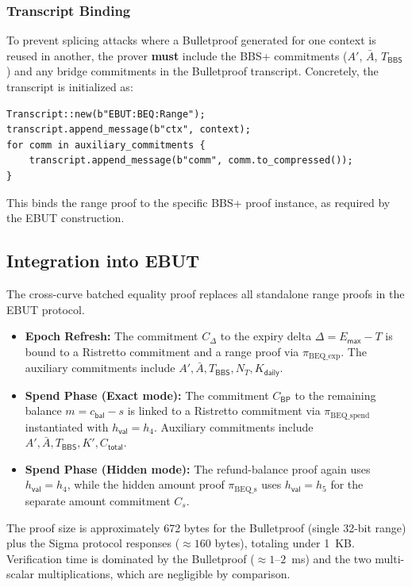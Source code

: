 \documentclass[11pt]{article}
\theoremstyle{definitionstyle}
\theoremstyle{plain}
\begin{document}
\subsubsection{Transcript Binding}
To prevent splicing attacks where a Bulletproof generated for one context is reused in another, the prover \textbf{must} include the BBS+ commitments ($A'$, $\bar{A}$, $T_{\mathsf{BBS}}$) and any bridge commitments in the Bulletproof transcript. Concretely, the transcript is initialized as:
\begin{verbatim}
Transcript::new(b"EBUT:BEQ:Range");
transcript.append_message(b"ctx", context);
for comm in auxiliary_commitments {
    transcript.append_message(b"comm", comm.to_compressed());
}
\end{verbatim}
This binds the range proof to the specific BBS+ proof instance, as required by the EBUT construction.

\subsection{Integration into EBUT}
The cross-curve batched equality proof replaces all standalone range proofs in the EBUT protocol.
\begin{itemize}
\item \textbf{Epoch Refresh:} The commitment $C_{\Delta}$ to the expiry delta $\Delta = E_{\mathsf{max}} - T$ is bound to a Ristretto commitment and a range proof via $\pi_{\text{BEQ\_exp}}$. The auxiliary commitments include $A', \bar{A}, T_{\mathsf{BBS}}, N_T, K_{\mathsf{daily}}$.
\item \textbf{Spend Phase (Exact mode):} The commitment $C_{\mathsf{BP}}$ to the remaining balance $m = c_{\mathsf{bal}} - s$ is linked to a Ristretto commitment via $\pi_{\text{BEQ\_spend}}$ instantiated with $h_{\mathsf{val}} = h_4$. Auxiliary commitments include $A', \bar{A}, T_{\mathsf{BBS}}, K', C_{\mathsf{total}}$.
\item \textbf{Spend Phase (Hidden mode):} The refund-balance proof again uses $h_{\mathsf{val}} = h_4$, while the hidden amount proof $\pi_{\text{BEQ\_s}}$ uses $h_{\mathsf{val}} = h_5$ for the separate amount commitment $C_s$.
\end{itemize}
The proof size is approximately 672 bytes for the Bulletproof (single 32-bit range) plus the Sigma protocol responses ($\approx 160$ bytes), totaling under 1~KB. Verification time is dominated by the Bulletproof ($\approx 1$--$2$~ms) and the two multi-scalar multiplications, which are negligible by comparison.
\end{document}
